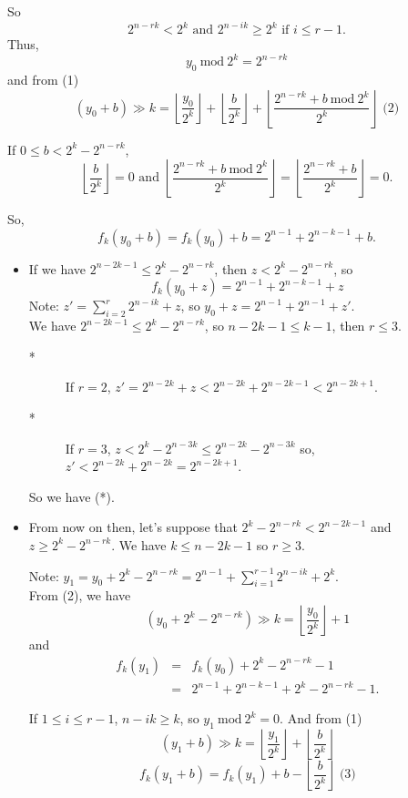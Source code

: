 \documentclass[a4paper,12pt]{article}
\begin{document}
So 
\[2^{n-rk} < 2^k \mbox{ and } 2^{n-ik} \ge 2^k\mbox{ if }i \le r-1.\]
 Thus,
\[y_0\ \mathrm{mod}\ 2^k = 2^{n-rk}\] and from (1)
\[(y_0 + b) \gg k = \left\lfloor\frac{y_0}{2^k}\right\rfloor +
\left\lfloor\frac{b}{2^k}\right\rfloor +
\left\lfloor\frac{2^{n-rk} + b\ \mathrm{mod}\ 2^k}{2^k}\right\rfloor
\mbox{ (2)}\]

If $0 \le b < 2^k - 2^{n-rk}$,
\[\left\lfloor\frac{b}{2^k}\right\rfloor = 0 \mbox{ and }
\left\lfloor\frac{2^{n-rk}+b\ \mathrm{mod}\ 2^k}{2^k}\right\rfloor =
\left\lfloor\frac{2^{n-rk}+b}{2^k}\right\rfloor = 0.\]

So,
\[f_k(y_0 + b) = f_k(y_0) + b = 2^{n-1} + 2^{n-k-1} + b.\]

\begin{itemize}
\item
If we have $2^{n-2k-1}\le 2^k - 2^{n-rk}$, then $z < 2^k - 2^{n-rk}$, so 
\[ f_k(y_0 + z) = 2^{n-1} + 2^{n-k-1} + z\]
Note: $z' = \sum_{i=2}^r 2^{n-ik} + z$, so $y_0 + z = 2^{n-1}+2^{n-1}+z'$.\\
We have $2^{n-2k-1} \le 2^{k}-2^{n-rk}$, so $n-2k-1 \le k-1$, then $r\le3$.
\begin{description}
\item[*] If $r=2$, $z' = 2^{n-2k} + z < 2^{n-2k} + 2^{n-2k-1} < 2^{n-2k+1}$.
\item[*] If $r=3$, $z < 2^k - 2^{n-3k} \le 2^{n-2k} - 2^{n-3k}$ so,\\
$z' < 2^{n-2k} + 2^{n-2k} = 2^{n-2k+1}$.
\end{description}
So we have (*).

\item
From now on then, let's suppose that $2^k - 2^{n-rk} < 2^{n-2k-1}$ and\\
$z \ge 2^k - 2^{n-rk}$.  We have $k \le n-2k-1$ so $r \ge 3$.

Note: $y_1 = y_0 + 2^k - 2^{n-rk} = 2^{n-1} + \sum_{i=1}^{r-1}2^{n-ik} + 2^k$.\\
From (2), we have
\[ (y_0 + 2^k - 2^{n-rk}) \gg k = \left\lfloor\frac{y_0}{2^k}\right\rfloor + 1\]
and
\begin{eqnarray*}
f_k(y_1)& = &f_k(y_0) + 2^k - 2^{n-rk} - 1\\ &=&
2^{n-1} + 2^{n-k-1} + 2^k - 2^{n-rk} - 1.
\end{eqnarray*}

If $1 \le i \le r-1$, $n-ik \ge k$, so $y_1\ \mathrm{mod}\ 2^k = 0$. And from
(1)
\[(y_1+b) \gg k = \left\lfloor\frac{y_1}{2^k}\right\rfloor +
\left\lfloor\frac{b}{2^k}\right\rfloor\]
\[f_k(y_1+b) = f_k(y_1) + b - \left\lfloor\frac{b}{2^k}\right\rfloor \mbox{ (3)}
\]


\end{itemize}
\end{document}
